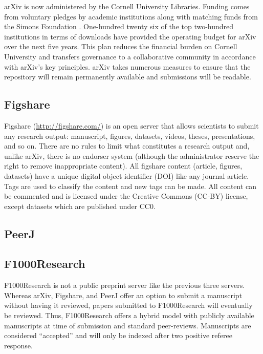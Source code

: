 \documentclass[letterpaper,twocolumn,superscriptaddress,showkeys]{revtex4}
\begin{document}
arXiv is now administered by the Cornell University Libraries.  Funding comes
from voluntary pledges by academic institutions along with matching funds from
the Simons Foundation \cite{arxiv_future}.  One-hundred twenty six of the top
two-hundred institutions in terms of downloads have provided the operating
budget for arXiv over the next five years.  This plan reduces the financial
burden on Cornell University and transfers governance to a collaborative
community in accordance with arXiv's key principles.  arXiv takes numerous
measures to ensure that the repository will remain permanently available and
submissions will be readable.

\subsection{Figshare}

Figshare (\href{http://figshare.com/}{http://figshare.com/}) is an open server
that allows scientists to submit any research output: manuscript, figures,
datasets, videos, theses, presentations, and so on. There are no rules to limit
what constitutes a research output and, unlike arXiv, there is no endorser
system (although the administrator reserve the right to remove inappropriate
content). All figshare content (article, figures, datasets) have a unique
digital object identifier (DOI) like any journal article. Tags are used to
classify the content and new tags can be made. All content can be commented and
is licensed under the Creative Commons (CC-BY) license, except datasets which
are published under CC0.

\subsection{PeerJ}


\subsection{F1000Research}


F1000Research is not a public preprint server like the previous three servers.
Whereas arXiv, Figshare, and PeerJ offer an option to submit a manuscript
without having it reviewed, papers submitted to F1000Research will eventually be
reviewed. Thus, F1000Research offers a hybrid model with publicly available
manuscripts at time of submission and standard peer-reviews. Manuscripts are
considered ``accepted'' and will only be indexed after two positive referee
response.
\end{document}
